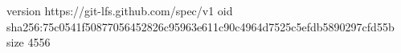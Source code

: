 version https://git-lfs.github.com/spec/v1
oid sha256:75c0541f50877056452826c95963e611c90c4964d7525c5efdb5890297cfd55b
size 4556
